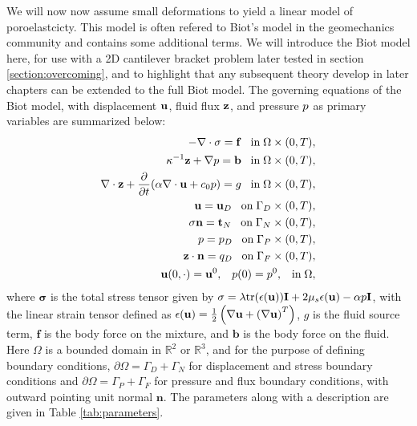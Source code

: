 We will now now assume small deformations to yield a linear model of poroelastcicty. This model is often refered to Biot's model in the geomechanics community and contains some additional terms. We will introduce the Biot model here, for use with a 2D cantilever bracket problem later tested in section \ref{section:overcoming}, and to highlight that any subsequent theory develop in later chapters can be extended to the full Biot model. The governing equations of the Biot model, with displacement $\mathbf{u}$, fluid flux $\mathbf{z}$, and pressure $p$ as primary variables are summarized below:  
\begin{subequations}
\begin{align}
\label{eqn:strong_mixture_momentum}
- \nabla \cdot \mathbf{\sigma}  =\mathbf{f} \;\;\; \mbox{in}\; \Omega \times (0,T),\\
{\mathbf{\kappa}^{-1}\mathbf{z}} + \nabla p =  \mathbf{b} \;\;\; \mbox{in}\; \Omega\times (0,T), \\
\nabla \cdot \mathbf{z} + \frac{\partial }{\partial t}(\alpha\nabla \cdot \mathbf{u} + c_{0} p )  = g   \;\;\; \mbox{in}\; \Omega \times (0,T),
\\
\mathbf{u} =\mathbf{u}_{D}   \;\;\; \mbox{on}\; \Gamma_{D} \times (0,T),
\\
\mathbf{\sigma}\mathbf{n} = \mathbf{t}_{N}   \;\;\; \mbox{on}\; \Gamma_{N} \times (0,T),
\\
p = p_{D}   \;\;\; \mbox{on}\; \Gamma_{P} \times (0,T),
\\
\mathbf{z}\cdot \mathbf{n} = {q_{D}}   \;\;\; \mbox{on}\; \Gamma_{F} \times (0,T),
\\
\mathbf{u}(0,\cdot) = \mathbf{u}^{0},  \;\;\; p(0) = p^{0}, \;\;\; \mbox{in}\; \Omega,
\end{align}
\label{eqn:strong_cont_system_biot}
\end{subequations}
where $\mathbf{\sigma}$ is the total stress tensor given by $\mathbf{\sigma}=\lambda \mbox{tr}(\mathbf{\epsilon}(\mathbf{u}))\mathbf{I} + 2\mu_{s}\mathbf{\epsilon}(\mathbf{u})-\alpha p\mathbf{I}$, with the linear strain tensor defined as $\mathbf{\epsilon}(\mathbf{u})=\frac{1}{2}\left(\nabla \mathbf{u} + \left( \nabla \mathbf{u} \right)^{T} \right)$, $g$ is the fluid source term, $\mathbf{f}$ is the body force on the mixture, and $\mathbf{b}$ is the body force on the fluid.  Here $\Omega$ is a bounded domain in $\mathbb{R}^{2}$ or $\mathbb{R}^{3}$, and for the purpose of defining boundary conditions, $\partial\Omega=\Gamma_D+\Gamma_N$ for displacement and stress boundary conditions and  $\partial\Omega=\Gamma_P+\Gamma_F$ for pressure and flux boundary conditions, with outward pointing unit normal $\mathbf{n}$. The parameters along with a description are given in Table \ref{tab:parameters}.
